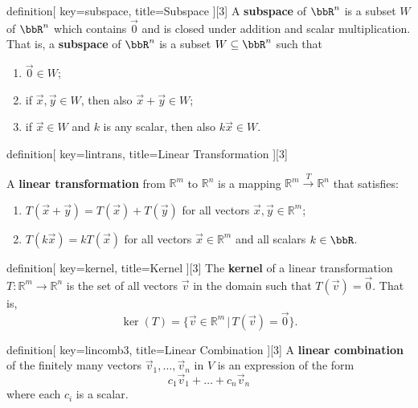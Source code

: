 
\begin{SaveConcept}{definition}[
		key=subspace,
		title={Subspace}
	][3]
        A {\bf subspace} of $\bbR^n$ is a subset $W$ of $\bbR^n$ which contains $\vec{0}$ and is closed under addition and scalar multiplication. That is, a {\bf subspace} of $\bbR^n$ is a subset $W\subseteq \bbR^n$ such that 
        \begin{enumerate}
            \item $\vec{0}\in W$;
            \item if $\vec x, \vec y \in W$, then also $\vec x + \vec y \in W$;
            \item if $\vec x  \in W$ and $k$ is any scalar, then  also $k\vec x \in W$.
        \end{enumerate}
\end{SaveConcept}


\begin{SaveConcept}{definition}[
		key=lintrans,
		title={Linear Transformation}
	][3]

	A {\bf linear transformation} from $\mathbb R^m$ to $\mathbb R^n$ is a mapping $\mathbb R^m \overset{T}\longrightarrow \mathbb R^n$  that satisfies:
	\begin{enumerate}
		\item $T(\vec x + \vec y) = T(\vec x) + T (\vec y)$ for all vectors $\vec x, \vec y \in \mathbb R^m$;
		\item $ T(k \vec x) = k T(\vec x)$ for all vectors $\vec x \in \mathbb R^m$ and all scalars $k\in\bbR$.
	\end{enumerate}
\end{SaveConcept}


\begin{SaveConcept}{definition}[
		key=kernel,
		title={Kernel}
	][3]
	The {\bf kernel} of a linear transformation $T:\mathbb R^m \longrightarrow \mathbb R^n$  is the set of all vectors $\vec v$ in the domain such that $T(\vec v) = \vec 0$. That is, 
        $$ 
        \ker(T) = \{ \vec v \in \mathbb R^m \, | \, T(\vec v) = \vec 0\}.
        $$
\end{SaveConcept}


\begin{SaveConcept}{definition}[
		key=lincomb3,
		title={Linear Combination}
	][3]
	A {\bf linear combination} of the finitely many vectors $\vec v_1, \dots, \vec v_n$ in $V$ is an expression of the form 
        $$
        c_1 \vec v_1 + \dots + c_n \vec v_n
        $$
        where each $c_i$ is a scalar. 
\end{SaveConcept}


